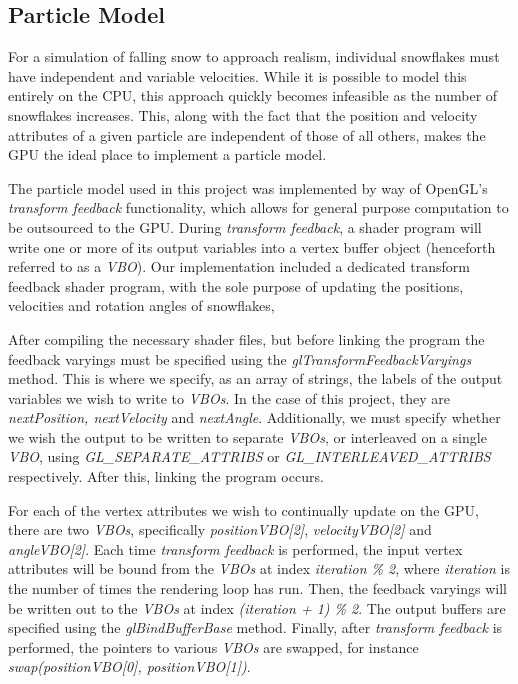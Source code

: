 \documentclass[conference]{acmsiggraph}
\begin{document}
\subsection{Particle Model}
For a simulation of falling snow to approach realism, individual snowflakes must have independent and variable velocities. While it is possible to model this entirely on the CPU, this approach quickly becomes infeasible as the number of snowflakes increases. This, along with the fact that the position and velocity attributes of a given particle are independent of those of all others, makes the GPU the ideal place to implement a particle model.

The particle model used in this project was implemented by way of OpenGL's \textit{transform feedback} functionality, which allows for general purpose computation to be outsourced to the GPU. During \textit{transform feedback}, a shader program will write one or more of its output variables into a vertex buffer object (henceforth referred to as a \textit{VBO}). Our implementation included a dedicated transform feedback shader program, with the sole purpose of updating the positions, velocities and rotation angles of snowflakes, 

After compiling the necessary shader files, but before linking the program the feedback varyings must be specified using the \textit{glTransformFeedbackVaryings} method. This is where we specify, as an array of strings, the labels of the output variables we wish to write to \textit{VBOs}. In the case of this project, they are \textit{nextPosition, nextVelocity} and \textit{nextAngle}. Additionally, we must specify whether we wish the output to be written to separate \textit{VBOs}, or interleaved on a single \textit{VBO}, using \textit{GL\_SEPARATE\_ATTRIBS} or \textit{GL\_INTERLEAVED\_ATTRIBS} respectively. After this, linking the program occurs.

For each of the vertex attributes we wish to continually update on the GPU, there are two \textit{VBOs}, specifically \textit{positionVBO[2]}, \textit{velocityVBO[2]} and \textit{angleVBO[2]}. Each time \textit{transform feedback} is performed, the input vertex attributes will be bound from the \textit{VBOs} at index \textit{iteration \% 2}, where \textit{iteration} is the number of times the rendering loop has run. Then, the feedback varyings will be written out to the \textit{VBOs} at index \textit{(iteration + 1) \% 2}. The output buffers are specified using the \textit{glBindBufferBase} method. Finally, after \textit{transform feedback} is performed, the pointers to various \textit{VBOs} are swapped, for instance \textit{swap(positionVBO[0], positionVBO[1])}.
\end{document}
